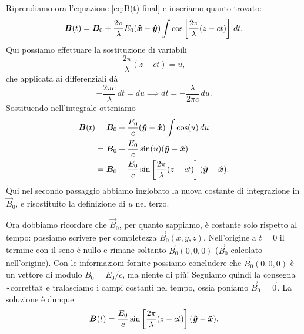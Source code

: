 \documentclass[10pt]{gulartcl}
\begin{document}
\begin{solution}
Riprendiamo ora l’equazione \eqref{eq:B(t)-final} e inseriamo quanto
trovato:
\begin{equation}
    \vec{B}(t)
    = \vec{B}_0 +\frac{2\pi}{\lambda} E_0 (\uvec{x} - \uvec{y})
      \int \cos\left[\frac{2\pi}{\lambda} (z - ct)\right] \, dt.
\end{equation}
Qui possiamo effettuare la sostituzione di variabili
\begin{equation}
    \frac{2\pi}{\lambda} (z - ct) = u,
\end{equation}
che applicata ai differenziali dà
\begin{equation}
    -\frac{2 \pi c}{\lambda} \, dt = du \implies dt
    = -\frac{\lambda}{2 \pi c} \, du.
\end{equation}
Sostituendo nell’integrale otteniamo
\begin{equation}
\begin{split}
    \vec{B}(t)
    &= \vec{B}_0 + \frac{E_0}{c} (\uvec{y} - \uvec{x})
       \int \cos(u) \, du \\
    &= \vec{B}_0 + \frac{E_0}{c} \sin(u) (\uvec{y} - \uvec{x}) \\
    &= \vec{B}_0 + \frac{E_0}{c} \sin\left[\frac{2\pi}{\lambda}(z - ct)\right]
       (\uvec{y} - \uvec{x}).
\end{split}
\end{equation}
Qui nel secondo passaggio abbiamo inglobato la nuova costante di
integrazione in $\vec{B}_0$, e risostituito la definizione di $u$ nel
terzo.

Ora dobbiamo ricordare che $\vec{B}_0$, per quanto sappiamo, è costante
solo rispetto al tempo: possiamo scrivere per completezza $\vec{B}_0(x, y,
z)$. Nell’origine a $t = 0$ il termine con il seno è nullo e rimane
soltanto $\vec{B}_0(0, 0, 0)$ ($\vec{B}_0$ calcolato nell’origine).
Con le informazioni fornite possiamo concludere che $\vec{B}_0(0, 0, 0)$ è
un vettore di modulo $B_0 = E_0 / c$, ma niente di più! Seguiamo quindi
la consegna «corretta» e tralasciamo i campi costanti nel tempo, ossia
poniamo $\vec{B}_0 = \vec{0}$. La soluzione è dunque
\begin{equation}
    \bm{B}(t) = \frac{E_0}{c} \sin\left[\frac{2\pi}{\lambda}(z -
    ct)\right] (\bm{\hat{y}} - \bm{\hat{x}}).
\end{equation}
\end{solution}
\end{document}
